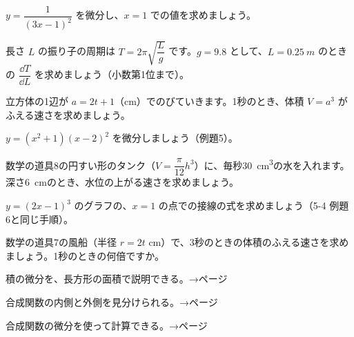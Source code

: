 \bkproblem $y=\dfrac{1}{(3x-1)^2}$ を微分し、$x=1$ での値を求めましょう。

\bkproblem 長さ $L$ の振り子の周期は $T=2\pi\sqrt{\dfrac{L}{g}}$ です。$g=9.8$ として、$L=\qty{0.25}{m}$ のときの $\dfrac{\dd T}{\dd L}$ を求めましょう（小数第1位まで）。

\bkproblem 立方体の1辺が $a=2t+1$（cm）でのびていきます。1秒のとき、体積 $V=a^3$ がふえる速さを求めましょう。

\bkproblem $y=(x^2+1)(x-2)^2$ を微分しましょう（例題5）。

\bkproblem 数学の道具8の円すい形のタンク（$V=\dfrac{\pi}{12}h^3$）に、毎秒\qty{30}{cm^3}の水を入れます。深さ\qty{6}{cm}のとき、水位の上がる速さを求めましょう。

\bkproblem $y=(2x-1)^3$ のグラフの、$x=1$ の点での接線の式を求めましょう（5-4 例題6と同じ手順）。

\bkproblem 数学の道具7の風船（半径 $r=2t$ cm）で、3秒のときの体積のふえる速さを求めましょう。1秒のときの何倍ですか。

\begin{furikaeri}
\begin{checklist}
\item 積の微分を、長方形の面積で説明できる。\hfill{\footnotesize\sffamily\color{bkTheme}→\pageref{bk:5-6:seki}ページ}
\item 合成関数の内側と外側を見分けられる。\hfill{\footnotesize\sffamily\color{bkTheme}→\pageref{bk:5-6:gousei}ページ}
\item 合成関数の微分を使って計算できる。\hfill{\footnotesize\sffamily\color{bkTheme}→\pageref{bk:5-6:chain}ページ}
\end{checklist}
\end{furikaeri}

